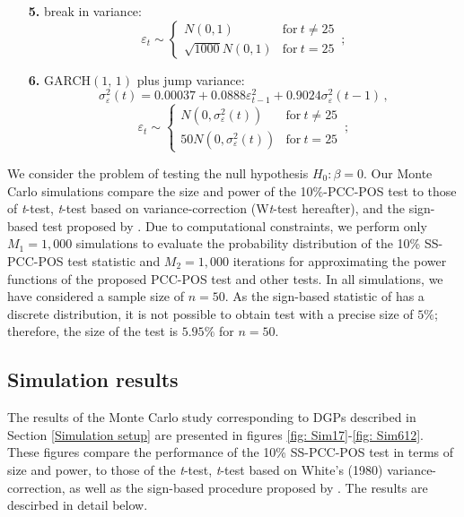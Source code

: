 \documentclass[harvard,11pt]{article}
\begin{document}
\begin{enumerate}
\item[\textbf{5.}] break in variance: 
\begin{equation*}
\varepsilon _{t}\sim \left\{ 
\begin{array}{cc}
N(0,1) & \text{for}\ t\neq 25 \\ 
\sqrt{1000}N(0,1) & \text{for}\ t=25%
\end{array}%
\,;\right.
\end{equation*}%
\item[\textbf{6.}] GARCH$(1,\,1)$ plus jump variance:%
\begin{equation*}
\sigma _{\varepsilon }^{2}(t)=0.00037+0.0888\varepsilon
_{t-1}^{2}+0.9024\sigma _{\varepsilon }^{2}(t-1)\,,
\end{equation*}%
\begin{equation*}
\varepsilon _{t}\sim \left\{ 
\begin{array}{cc}
N(0,\sigma _{\varepsilon }^{2}(t)) & \text{for}\ t\neq 25 \\ 
50N(0,\sigma _{\varepsilon }^{2}(t)) & \text{for}\ t=25%
\end{array}%
\right. \,;
\end{equation*}%
\end{enumerate}
We consider the problem of testing the null hypothesis $H_0: \beta=0$. Our Monte Carlo simulations compare the size and power of the 10\%-PCC-POS test to those of \textit{t}-test, \textit{t}-test based on \citet{white1980heteroskedasticity} variance-correction (W\textit{t}-test hereafter), and the sign-based test proposed by \citet{dufour1995exact}. Due to computational constraints, we perform only $M_1=1,000$ simulations to evaluate the probability distribution of the 10\% SS-PCC-POS test statistic and $M_2=1,000$ iterations for approximating the power functions of the proposed PCC-POS test and other tests. In all simulations, we have considered a sample size of $n=50$. As the sign-based statistic of \citet{dufour1995exact} has a discrete distribution, it is not possible to obtain test with a precise size of $5\%$; therefore, the size of the test is $5.95\%$ for $n=50$. 
\subsection{Simulation results \label{Simulation results}}

The results of the Monte Carlo study corresponding to DGPs described in Section \ref{Simulation setup} are presented in figures \ref{fig: Sim17}-\ref{fig: Sim612}. These figures compare the performance of the 10\% SS-PCC-POS test in terms of size and power, to those of the \textit{t}-test, \textit{t}-test based on White's (1980) variance-correction, as well as the sign-based procedure proposed by \citet{dufour2010exact}. The results are descirbed in detail below.
\end{document}
